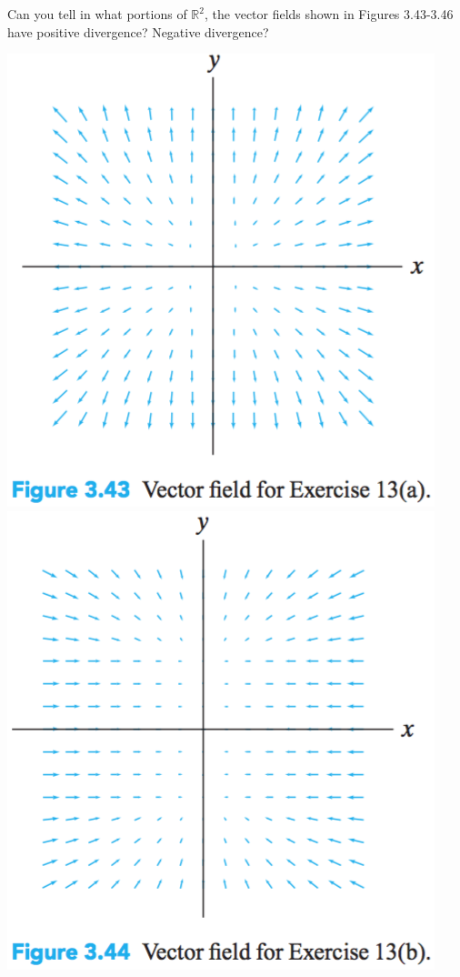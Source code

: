 \documentclass[12pt,letterpaper]{hmcpset}
\newcommand{\RR}{\mathbb{R}}
\begin{document}
\begin{problem}[Colley 3.4.13]
    Can you tell in what portions of $\RR^2$, the vector fields shown
    in Figures 3.43-3.46 have positive divergence? Negative
    divergence?
    \begin{center}
        \includegraphics[scale=0.8]{img/3_4_13a}\qquad
        \includegraphics[scale=0.8]{img/3_4_13b}\\

\end{center}
\end{problem}
\end{document}
